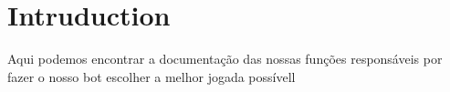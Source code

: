 \hypertarget{index_intro_sec}{}\section{Intruduction}\label{index_intro_sec}
Aqui podemos encontrar a documentação das nossas funções responsáveis por fazer o nosso bot escolher a melhor jogada possívell 